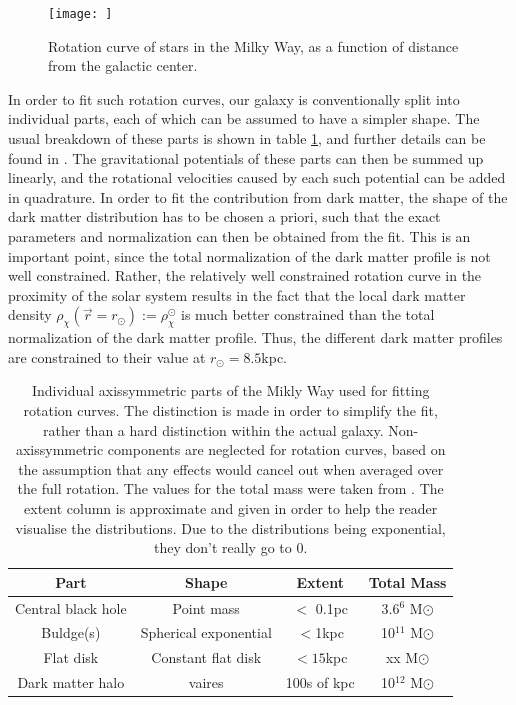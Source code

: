 \begin{figure}[h]
    \centering
    \texttt{[image: ]}
    \caption{Rotation curve of stars in the Milky Way, as a function of distance from the galactic center.}
    \label{fig:MilkyWayRotationCurve}
\end{figure}

In order to fit such rotation curves, our galaxy is conventionally split into individual parts, each of which can be assumed to have a simpler shape. The usual breakdown of these parts is shown in table \ref{tab:MilkyWayBreakdown}, and further details can be found in \cite{Sofue_2016}. The gravitational potentials of these parts can then be summed up linearly, and the rotational velocities caused by each such potential can be added in quadrature. In order to fit the contribution from dark matter, the shape of the dark matter distribution has to be chosen a priori, such that the exact parameters and normalization can then be obtained from the fit. This is an important point, since the total normalization of the dark matter profile is not well constrained. Rather, the relatively well constrained rotation curve in the proximity of the solar system results in the fact that the local dark matter density $\rho_\chi(\vec{r}=r_\odot) := \rho_\chi^\odot$ is much better constrained than the total normalization of the dark matter profile. Thus, the different dark matter profiles are constrained to their value at $r_\odot = 8.5$kpc. \\
\begin{table}[h]
    \centering
    \begin{tabular}{|c|c|c|c|}
        \hline
        Part & Shape & Extent & Total Mass \\
        \hline
        Central black hole & Point mass & $<$ 0.1pc & 3.6\times 10$^6$ M$\odot$ \\
        \hline
        Buldge(s) & Spherical exponential & $<$1kpc & 10$^11$ M$\odot$ \\
        \hline
        Flat disk & Constant flat disk & $<15$kpc & xx M$\odot$ \\
        \hline
        Dark matter halo & vaires & 100s of kpc & 10$^12$ M$\odot$ \\
        \hline
    \end{tabular}
    \label{tab:MilkyWayBreakdown}
    \caption{Individual axissymmetric parts of the Mikly Way used for fitting rotation curves. The distinction is made in order to simplify the fit, rather than a hard distinction within the actual galaxy. Non-axissymmetric components are neglected for rotation curves, based on the assumption that any effects would cancel out when averaged over the full rotation. The values for the total mass were taken from \cite{Sofue_2016}. The extent column is approximate and given in order to help the reader visualise the distributions. Due to the distributions being exponential, they don't really go to 0.}

\end{table}

